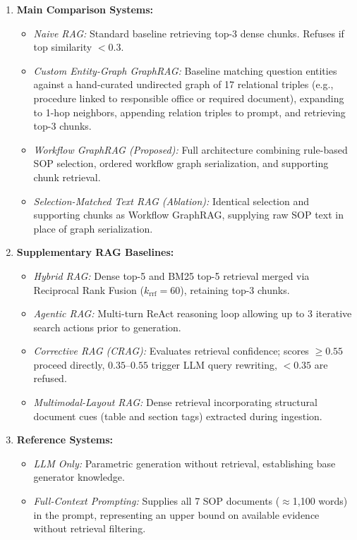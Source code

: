 \documentclass[preprint,10pt]{elsarticle}
\begin{document}
\begin{enumerate}[leftmargin=*]
\item \textbf{Main Comparison Systems:}
  \begin{itemize}
  \item \emph{Naive RAG:} Standard baseline retrieving top-3 dense chunks. Refuses if top similarity $< 0.3$.
  \item \emph{Custom Entity-Graph GraphRAG:} Baseline matching question entities against a hand-curated undirected graph of 17 relational triples (e.g., procedure linked to responsible office or required document), expanding to 1-hop neighbors, appending relation triples to prompt, and retrieving top-3 chunks.
  \item \emph{Workflow GraphRAG (Proposed):} Full architecture combining rule-based SOP selection, ordered workflow graph serialization, and supporting chunk retrieval.
  \item \emph{Selection-Matched Text RAG (Ablation):} Identical selection and supporting chunks as Workflow GraphRAG, supplying raw SOP text in place of graph serialization.
  \end{itemize}
\item \textbf{Supplementary RAG Baselines:}
  \begin{itemize}
  \item \emph{Hybrid RAG:} Dense top-5 and BM25 top-5 retrieval merged via Reciprocal Rank Fusion ($k_{\text{rrf}}=60$), retaining top-3 chunks.
  \item \emph{Agentic RAG:} Multi-turn ReAct reasoning loop allowing up to 3 iterative search actions prior to generation.
  \item \emph{Corrective RAG (CRAG):} Evaluates retrieval confidence; scores $\geq 0.55$ proceed directly, $0.35$--$0.55$ trigger LLM query rewriting, $< 0.35$ are refused.
  \item \emph{Multimodal-Layout RAG:} Dense retrieval incorporating structural document cues (table and section tags) extracted during ingestion.
  \end{itemize}
\item \textbf{Reference Systems:}
  \begin{itemize}
  \item \emph{LLM Only:} Parametric generation without retrieval, establishing base generator knowledge.
  \item \emph{Full-Context Prompting:} Supplies all 7 SOP documents ($\approx$1,100 words) in the prompt, representing an upper bound on available evidence without retrieval filtering.
  \end{itemize}
\end{enumerate}
\end{document}
